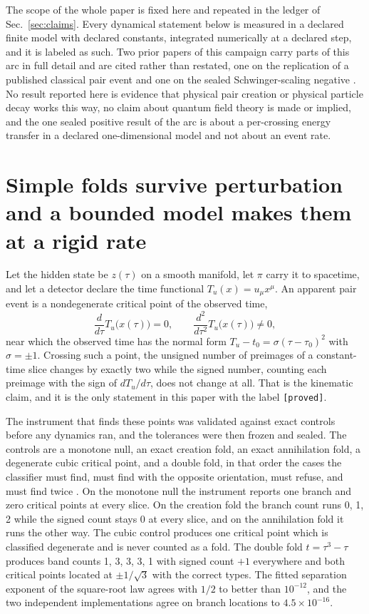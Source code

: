 \documentclass[aps,pre,reprint,nofootinbib,floatfix]{revtex4-2}
\begin{document}
The scope of the whole paper is fixed here and repeated in the ledger
of Sec.~\ref{sec:claims}.  Every dynamical statement below is measured
in a declared finite model with declared constants, integrated
numerically at a declared step, and it is labeled as such.  Two prior
papers of this campaign carry parts of this arc in full detail and are
cited rather than restated, one on the replication of a published
classical pair event \cite{ZenodoCayley} and one on the sealed
Schwinger-scaling negative \cite{ZenodoSchwinger}.  No result reported
here is evidence that physical pair creation or physical particle decay
works this way, no claim about quantum field theory is made or implied,
and the one sealed positive result of the arc is about a per-crossing
energy transfer in a declared one-dimensional model and not about an
event rate.

\section{Simple folds survive perturbation and a bounded model makes
them at a rigid rate}
\label{sec:net}

Let the hidden state be $z(\tau)$ on a smooth manifold, let
$\pi$ carry it to spacetime, and let a detector declare the time
functional $T_u(x) = u_\mu x^\mu$.  An apparent pair event is a
nondegenerate critical point of the observed time,
\begin{equation}
  \frac{d}{d\tau}T_u\bigl(x(\tau)\bigr) = 0,
  \qquad
  \frac{d^2}{d\tau^2}T_u\bigl(x(\tau)\bigr) \neq 0,
  \label{eq:fold}
\end{equation}
near which the observed time has the normal form
$T_u - t_0 = \sigma (\tau - \tau_0)^2$ with $\sigma = \pm 1$.  Crossing
such a point, the unsigned number of preimages of a constant-time slice
changes by exactly two while the signed number, counting each preimage
with the sign of $dT_u/d\tau$, does not change at all.  That is the
kinematic claim, and it is the only statement in this paper with the
label \texttt{[proved]}.

The instrument that finds these points was validated against exact
controls before any dynamics ran, and the tolerances were then frozen
and sealed.  The controls are a monotone null, an exact creation fold,
an exact annihilation fold, a degenerate cubic critical point, and a
double fold, in that order the cases the classifier must find, must
find with the opposite orientation, must refuse, and must find twice
\cite{Whitney1955, ArnoldGZ}.  On the monotone null the instrument
reports one
branch and zero critical points at every slice.  On the creation fold
the branch count runs 0, 1, 2 while the signed count stays 0 at every
slice, and on the annihilation fold it runs the other way.  The cubic
control produces one critical point which is classified degenerate and
is never counted as a fold.  The double fold $t = \tau^3 - \tau$
produces band counts 1, 3, 3, 3, 1 with signed count $+1$ everywhere
and both critical points located at $\pm 1/\sqrt{3}$ with the correct
types.  The fitted separation exponent of the square-root law agrees
with $1/2$ to better than $10^{-12}$, and the two independent
implementations agree on branch locations to $4.5 \times 10^{-16}$.
\end{document}
